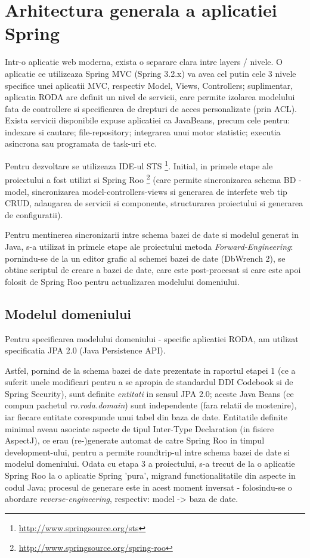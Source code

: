 \section{Arhitectura generala a aplicatiei Spring}

Intr-o aplicatie web moderna, exista o separare clara intre layers /
nivele. O aplicatie ce utilizeaza Spring MVC (Spring 3.2.x) va avea cel putin
cele 3 nivele specifice unei aplicatii MVC, respectiv Model, Views, Controllers; 
suplimentar, aplicatia RODA are definit un nivel de servicii, 
care permite izolarea modelului fata de controllere si specificarea de drepturi de acces personalizate (prin ACL). 
Exista servicii disponibile expuse aplicatiei ca JavaBeans, precum cele pentru: 
indexare si cautare; file-repository; 
integrarea unui motor statistic; 
executia asincrona sau programata de task-uri etc.


Pentru dezvoltare se utilizeaza IDE-ul STS
\footnote{\url{http://www.springsource.org/sts}}.
Initial, in primele etape ale proiectului a fost utilizt si Spring Roo
\footnote{\url{http://www.springsource.org/spring-roo}}
(care permite sincronizarea schema BD - model, sincronizarea model-controllers-views si generarea de
interfete web tip CRUD, adaugarea de servicii si componente, structurarea proiectului si generarea de configuratii).

Pentru mentinerea sincronizarii intre schema bazei de date si modelul generat
in Java, s-a utilizat in primele etape ale proiectului metoda \emph{Forward-Engineering}: 
pornindu-se de la un editor grafic al schemei bazei de date (DbWrench 2), %
se obtine scriptul de creare a bazei de date, 
care este post-procesat si care este apoi folosit de Spring Roo pentru
actualizarea modelului domeniului.

\subsection{Modelul domeniului}
Pentru specificarea modelului domeniului - specific aplicatiei RODA, 
am utilizat specificatia JPA 2.0 (Java Persistence API).

Astfel, pornind de la schema bazei de date prezentate in raportul etapei 1 (ce
a suferit unele modificari pentru a se apropia de standardul DDI Codebook si
de Spring Security), sunt definite \emph{entitati} in sensul JPA 2.0; 
aceste Java Beans (ce compun pachetul \emph{ro.roda.domain}) 
sunt independente (fara relatii de mostenire),
iar fiecare entitate corespunde unui tabel din baza de date. 
Entitatile definite minimal aveau asociate 
aspecte de tipul Inter-Type Declaration (in fisiere AspectJ), 
ce erau (re-)generate automat de catre Spring Roo in timpul development-ului, 
pentru a permite roundtrip-ul intre schema bazei de date si modelul domeniului.
Odata cu etapa 3 a proiectului, s-a trecut de la o aplicatie Spring Roo 
la o aplicatie Spring 'pura', 
migrand functionalitatile din aspecte in codul Java; 
procesul de generare este in acest moment inversat - 
folosindu-se o abordare \emph{reverse-engineering}, respectiv: model -> baza de date. 

